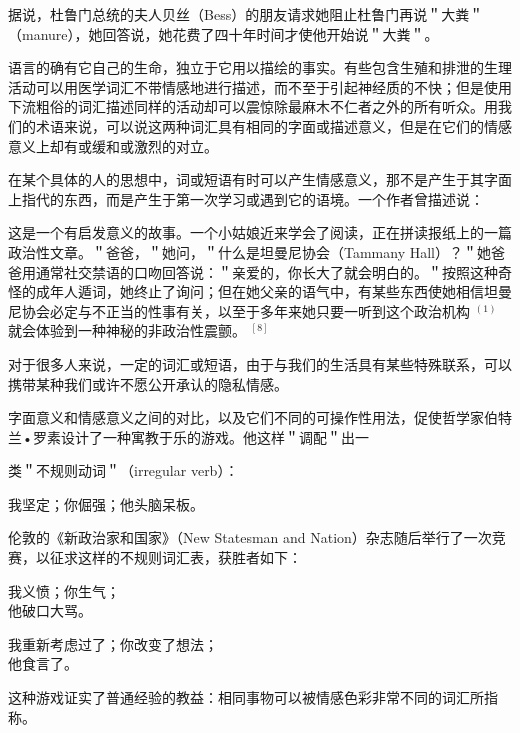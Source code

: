 据说，杜鲁门总统的夫人贝丝（Bess）的朋友请求她阻止杜鲁门再说＂大粪＂（manure），她回答说，她花费了四十年时间才使他开始说＂大粪＂。

语言的确有它自己的生命，独立于它用以描绘的事实。有些包含生殖和排泄的生理活动可以用医学词汇不带情感地进行描述，而不至于引起神经质的不快；但是使用下流粗俗的词汇描述同样的活动却可以震惊除最麻木不仁者之外的所有听众。用我们的术语来说，可以说这两种词汇具有相同的字面或描述意义，但是在它们的情感意义上却有或缓和或激烈的对立。

在某个具体的人的思想中，词或短语有时可以产生情感意义，那不是产生于其字面上指代的东西，而是产生于第一次学习或遇到它的语境。一个作者曾描述说：

\begin{displayquote}
这是一个有启发意义的故事。一个小姑娘近来学会了阅读，正在拼读报纸上的一篇政治性文章。＂爸爸，＂她问，＂什么是坦曼尼协会（Tammany Hall）？＂她爸爸用通常社交禁语的口吻回答说：＂亲爱的，你长大了就会明白的。＂按照这种奇怪的成年人遁词，她终止了询问；但在她父亲的语气中，有某些东西使她相信坦曼尼协会必定与不正当的性事有关，以至于多年来她只要一听到这个政治机构 ${ }^{(1)}$ 就会体验到一种神秘的非政治性震颤。 ${ }^{[8]}$
\end{displayquote}

对于很多人来说，一定的词汇或短语，由于与我们的生活具有某些特殊联系，可以携带某种我们或许不愿公开承认的隐私情感。

字面意义和情感意义之间的对比，以及它们不同的可操作性用法，促使哲学家伯特兰•罗素设计了一种寓教于乐的游戏。他这样＂调配＂出一

类＂不规则动词＂（irregular verb）：

我坚定；你倔强；他头脑呆板。

伦敦的《新政治家和国家》（New Statesman and Nation）杂志随后举行了一次竞赛，以征求这样的不规则词汇表，获胜者如下：

我义愤；你生气；\\
他破口大骂。

我重新考虑过了；你改变了想法；\\
他食言了。

这种游戏证实了普通经验的教益：相同事物可以被情感色彩非常不同的词汇所指称。 
